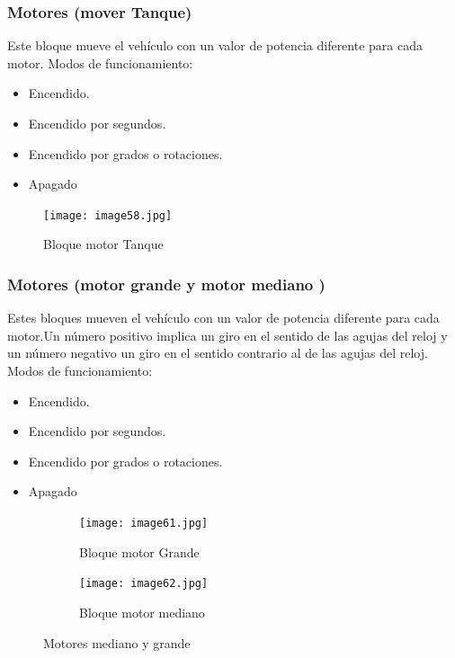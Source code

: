 \documentclass[12pt,a4paper]{article}
\begin{document}
\subsubsection{Motores (mover Tanque)}
Este bloque mueve el vehículo con un valor de potencia diferente para cada motor.
Modos de funcionamiento:
\begin{itemize}
\item Encendido.
\item Encendido por segundos.
\item Encendido por grados o rotaciones.
\item Apagado
\end{itemize}
\begin{figure}[H]
	\caption{Bloque motor Tanque}
	\texttt{[image: image58.jpg]}
	\centering
\end{figure}
\subsubsection{Motores (motor grande y motor mediano )}
Estes bloques mueven el vehículo con un valor de potencia diferente para cada motor.Un
número positivo implica un giro en el sentido de las agujas del reloj y un
número negativo un giro en el sentido contrario al de las agujas del reloj.
Modos de funcionamiento:
\begin{itemize}
\item Encendido.
\item Encendido por segundos.
\item Encendido por grados o rotaciones.
\item Apagado
\end{itemize}
\begin{figure}
\begin{minipage}{0.45\linewidth}
  \centering
  \begin{subfigure}{.7\textwidth}
	\caption{Bloque motor Grande}
	\texttt{[image: image61.jpg]}
	\label{fig:sub1}
  \end{subfigure} %
  \end{minipage}
  \hspace{0.5cm}
  \begin{minipage}{0.45\linewidth}
  \begin{subfigure}{.7\textwidth}
	\caption{Bloque motor mediano}
	\texttt{[image: image62.jpg]}
	\label{fig:sub2}
  \end{subfigure}
\end{minipage}
  \caption{Motores mediano y grande}
\end{figure}
\end{document}
